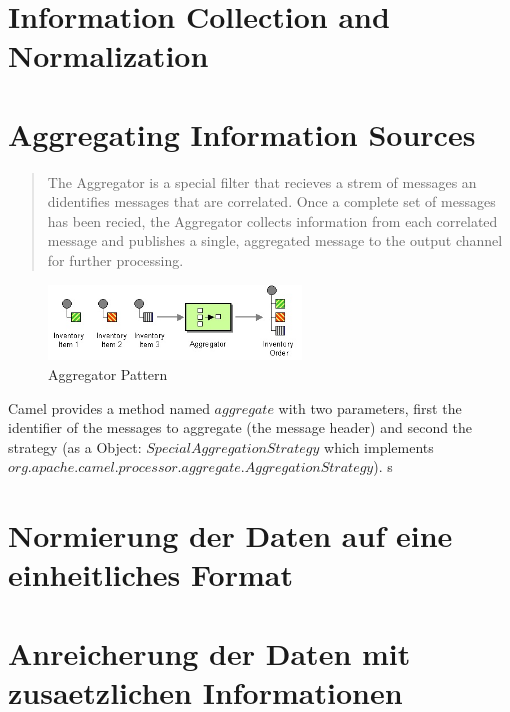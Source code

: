 \documentclass[11pt,english,ngerman, headsepline]{scrreprt}
\begin{document}
\chapter{Information Collection and Normalization}





\chapter{Aggregating Information Sources} 
\begin{quote}
The Aggregator is a special filter that recieves a strem of messages an
didentifies messages that are correlated. Once a complete set of messages has
been recied, the Aggregator collects information from each correlated message
and publishes a single, aggregated message to the output channel for further
processing. \cite{hohpe2003enterprise}
\end{quote}

  \begin{figure}[h!]
	\begin{center}
	\includegraphics[width=0.6\textwidth]{pics/Aggregator.jpg}
	\end{center}
	\caption{Aggregator Pattern \cite{hohpe2003enterprise}}
	\label{utilityTree} 
   \end{figure}


Camel provides a method named $aggregate$ with two parameters, first the
identifier of the messages to aggregate (the message header) and second the
strategy (as a Object: $SpecialAggregationStrategy$ which implements\\
$org.apache.camel.processor.aggregate.AggregationStrategy$).
 s




\chapter{Normierung der Daten auf eine einheitliches Format}
\chapter{Anreicherung der Daten mit zusaetzlichen Informationen}
\end{document}
